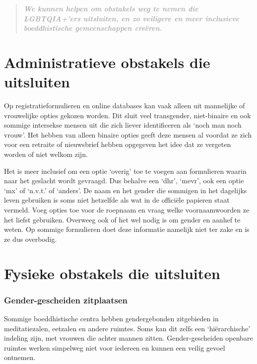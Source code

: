 \documentclass[12pt,openany]{book}
\begin{document}
\begin{quote}
\textit{\large \textbf{\textcolor{darkgray}{We kunnen helpen om obstakels weg te nemen die \mbox{LGBTQIA+'ers} uitsluiten, en zo veiligere en meer inclusieve boeddhistische gemeenschappen creëren.}}}
\end{quote}

\section*{Administratieve obstakels die uitsluiten}

Op registratieformulieren en online databases kan vaak alleen uit mannelijke of vrouwelijke opties gekozen worden.  Dit sluit veel transgender, niet-binaire en ook sommige intersekse mensen uit die zich liever identificeren als `noch man noch vrouw'. Het hebben van alleen binaire opties geeft deze mensen al voordat ze zich voor een retraite of nieuwsbrief hebben opgegeven het idee dat ze vergeten worden of niet welkom zijn.

Het is meer inclusief om een optie `overig' toe te voegen aan formulieren waarin naar het geslacht wordt gevraagd. Dus behalve een `dhr', `mevr', ook een optie `mx' of `n.v.t.' of `anders'. De naam en het gender die sommigen in het dagelijks leven gebruiken is soms niet hetzelfde als wat in de officiële papieren staat vermeld. Voeg opties toe voor de roepnaam en vraag welke voornaamwoorden ze het liefst gebruiken. Overweeg ook of het wel nodig is om gender en aanhef te weten. Op sommige formulieren doet deze informatie namelijk niet ter zake en is ze dus overbodig.

\section*{Fysieke obstakels die uitsluiten}

\subsubsection*{Gender-gescheiden zitplaatsen}

Sommige boeddhistische centra hebben gendergebonden zitgebieden in meditatiezalen, eetzalen en andere ruimtes. Soms kan dit zelfs een `hiërarchische' indeling zijn, met vrouwen die achter mannen zitten. Gender-gescheiden openbare ruimtes werken simpelweg niet voor iedereen en kunnen een veilig gevoel ontnemen. 
\end{document}
